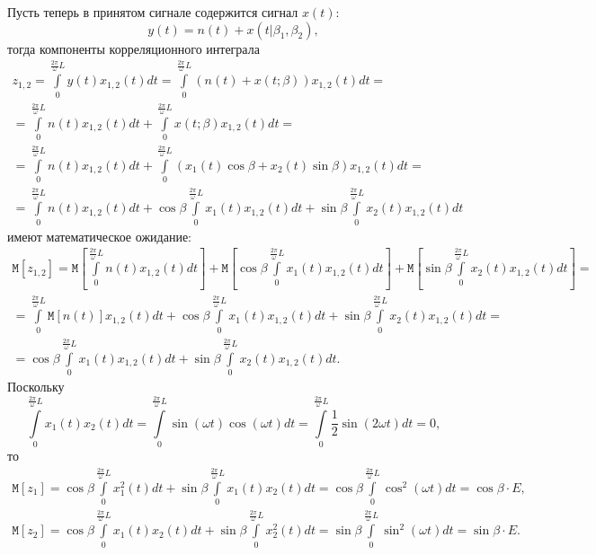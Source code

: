 \documentclass[a4paper,12pt]{article}
\newcommand{\expectation}[1]{\mathtt{M} \left [ #1 \right ]}
\begin{document}
    Пусть теперь в принятом сигнале содержится сигнал $x(t)$:
    \[
        y(t) = n(t) + x(t | \beta_1, \beta_2) ,
    \]
    тогда компоненты корреляционного интеграла
    \begin{multline*}
        z_{1,2}
        = \int \limits_{0}^{\frac{2 \pi}{\omega}L} y(t) x_{1,2}(t) dt
        = \int \limits_{0}^{\frac{2 \pi}{\omega}L} ( n(t) + x(t;\beta) ) x_{1,2}(t) dt = \\
%
        = \int \limits_{0}^{\frac{2 \pi}{\omega}L} n(t) x_{1,2}(t) dt + \int \limits_{0}^{\frac{2 \pi}{\omega}L} x(t;\beta) x_{1,2}(t) dt = \\
%
        = \int \limits_{0}^{\frac{2 \pi}{\omega}L} n(t) x_{1,2}(t) dt + \int \limits_{0}^{\frac{2 \pi}{\omega}L} \left ( x_1(t) \cos \beta + x_2(t) \sin \beta \right ) x_{1,2}(t) dt = \\
        = \int \limits_{0}^{\frac{2 \pi}{\omega}L} n(t) x_{1,2}(t) dt + \cos \beta \int \limits_{0}^{\frac{2 \pi}{\omega}L} x_1(t) x_{1,2}(t) dt + \sin \beta \int \limits_{0}^{\frac{2 \pi}{\omega}L} x_2(t) x_{1,2}(t) dt
    \end{multline*}
    имеют математическое ожидание:
    \begin{multline*}
        \expectation{z_{1,2}}
        = \expectation{\int \limits_{0}^{\frac{2 \pi}{\omega}L} n(t) x_{1,2}(t) dt}
        + \expectation{\cos \beta \int \limits_{0}^{\frac{2 \pi}{\omega}L} x_1(t) x_{1,2}(t) dt}
        + \expectation{\sin \beta \int \limits_{0}^{\frac{2 \pi}{\omega}L} x_2(t) x_{1,2}(t) dt} = \\
        = \int \limits_{0}^{\frac{2 \pi}{\omega}L} \expectation{n(t)} x_{1,2}(t) dt
        + \cos \beta \int \limits_{0}^{\frac{2 \pi}{\omega}L} x_1(t) x_{1,2}(t) dt
        + \sin \beta \int \limits_{0}^{\frac{2 \pi}{\omega}L} x_2(t) x_{1,2}(t) dt = \\
        = \cos \beta \int \limits_{0}^{\frac{2 \pi}{\omega}L} x_1(t) x_{1,2}(t) dt
        + \sin \beta \int \limits_{0}^{\frac{2 \pi}{\omega}L} x_2(t) x_{1,2}(t) dt .
    \end{multline*}
    Поскольку
    \[
        \int \limits_{0}^{\frac{2 \pi}{\omega}L} x_1(t) x_2(t) dt
        = \int \limits_{0}^{\frac{2 \pi}{\omega}L} \sin( \omega t ) \cos( \omega t ) dt
        = \int \limits_{0}^{\frac{2 \pi}{\omega}L} \frac{1}{2} \sin( 2 \omega t ) dt
        = 0,
    \]
    то
    \begin{gather*}
        \expectation{z_1}
        = \cos \beta \int \limits_{0}^{\frac{2 \pi}{\omega}L} x_1^2(t) dt + \sin \beta \int \limits_{0}^{\frac{2 \pi}{\omega}L} x_1(t) x_2(t) dt
        = \cos \beta \int \limits_{0}^{\frac{2 \pi}{\omega}L} \cos^2 ( \omega t ) dt
        = \cos \beta \cdot E, \\
        \expectation{z_2}
        = \cos \beta \int \limits_{0}^{\frac{2 \pi}{\omega}L} x_1(t) x_2(t) dt + \sin \beta \int \limits_{0}^{\frac{2 \pi}{\omega}L} x_2^2(t) dt
        = \sin \beta \int \limits_{0}^{\frac{2 \pi}{\omega}L} \sin^2 ( \omega t ) dt
        = \sin \beta \cdot E .
    \end{gather*}
\end{document}
